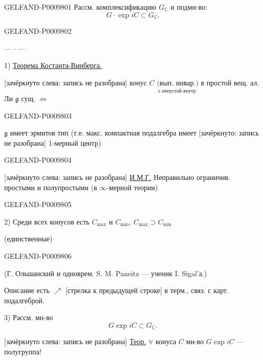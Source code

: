 \begin{GelfandAdjacentEvidence}{GELFAND-P000980}{1}
Рассм. комплексификацию $G_{\mathbb C}$ и подмн-во:
\[
 G\cdot\exp iC\subset G_{\mathbb C}.
\]
\end{GelfandAdjacentEvidence}
\begin{GelfandAdjacentEvidence}{GELFAND-P000980}{2}


\begin{center}--- \(\cdot\) ---\end{center}

1) \underline{Теорема Костанта-Винберга.}

[зачёркнуто слева: запись не разобрана] конус $C$
\(\underset{\text{с непустой внутр.}}{\text{(вып. инвар.)}}\)
в простой вещ. ал. Ли $\mathfrak g$ сущ. $\Leftrightarrow$
\end{GelfandAdjacentEvidence}
\begin{GelfandAdjacentEvidence}{GELFAND-P000980}{3}


$\mathfrak g$ имеет эрмитов тип (т.е. макс. компактная подалгебра имеет
[зачёркнуто: запись не разобрана] 1-мерный центр)
\end{GelfandAdjacentEvidence}
\begin{GelfandAdjacentEvidence}{GELFAND-P000980}{4}


[зачёркнуто слева: запись не разобрана] \underline{И.М.Г.} Неправильно ограничив. простыми и полупростыми
(в $\infty$-мерной теории)
\end{GelfandAdjacentEvidence}
\begin{GelfandAdjacentEvidence}{GELFAND-P000980}{5}


2) Среди всех конусов есть $C_{\max}$ и $C_{\min}$,\quad
$C_{\max}\supset C_{\min}$

(единственные)
\end{GelfandAdjacentEvidence}
\begin{GelfandAdjacentEvidence}{GELFAND-P000980}{6}


(Г. Ольшанский и одноврем. S. M. Paneitz --- ученик I. Sigal’а.)

Описание есть $\nearrow$ [стрелка к предыдущей строке] в терм., связ. с карт. подалгеброй.

3) Рассм. мн-во
\[
 G\exp iC\subset G_{\mathbb C}.
\]

[зачёркнуто слева: запись не разобрана] \underline{Теор.} $\forall$ конуса $C$ мн-во $G\exp iC$ --- полугруппа!
\end{GelfandAdjacentEvidence}
